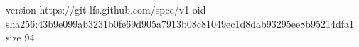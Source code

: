 version https://git-lfs.github.com/spec/v1
oid sha256:43b9e099ab3231b0fe69d905a7913b08c81049ec1d8dab93295ee8b95214dfa1
size 94
